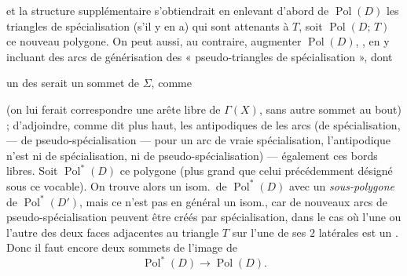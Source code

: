 \documentclass[11pt,a4paper]{article}
\begin{document}
et la structure supplémentaire s'obtiendrait en enlevant d'abord de $\operatorname{Pol}(D)$ les triangles de spécialisation (s'il y en a) qui sont attenants à $T$, soit $\operatorname{Pol}(D;\,T)$ \struck{\ill{}} ce nouveau polygone. On peut aussi, au contraire, augmenter \struck{\ill{}} $\operatorname{Pol}(D)$, , en y incluant des arcs de générisation des « pseudo-triangles de spécialisation », dont

un des  serait un sommet de $\Sigma$, comme

(on lui ferait correspondre une arête libre de $\Gamma(X)$, sans autre sommet au bout) ;  d'adjoindre, comme dit plus haut, les antipodiques de  les arcs (de spécialisation, --- de pseudo-spécialisation --- pour un arc de vraie spécialisation, \struck{\ill{}} l'antipodique n'est ni de spécialisation, ni de pseudo-spécialisation) --- également ces bords libres. Soit $\operatorname{Pol}^{*}(D)$ ce polygone (plus grand que celui précédemment désigné sous ce vocable). On trouve alors un \struck{\ill{}} isom.\ de $\operatorname{Pol}^{*}(D)$ avec un \emph{sous-polygone} de $\operatorname{Pol}^{*}(D')$, mais ce n'est pas en général un isom., car de nouveaux arcs  de pseudo-spécialisation peuvent être créés par spécialisation, dans le cas où l'une ou l'autre des deux faces adjacentes au triangle $T$ sur l'une de ses $2$  latérales est un . Donc il faut  encore deux  sommets de l'image de
\[
\operatorname{Pol}^{*}(D) \to \operatorname{Pol}(D).
\]
\end{document}
